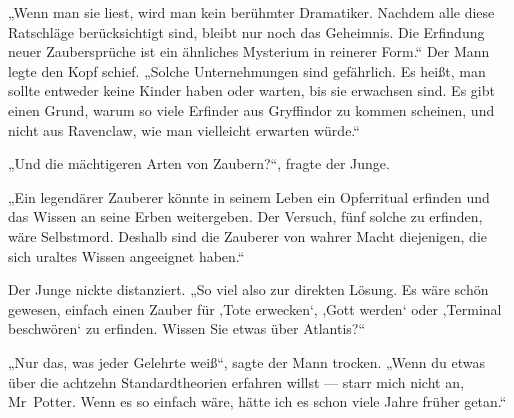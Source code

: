 „Wenn man sie liest, wird man kein berühmter Dramatiker. Nachdem alle diese Ratschläge berücksichtigt sind, bleibt nur noch das Geheimnis. Die Erfindung neuer Zaubersprüche ist ein ähnliches Mysterium in reinerer Form.“ Der Mann legte den Kopf schief.
„Solche Unternehmungen sind gefährlich. Es heißt, man sollte entweder keine Kinder haben oder warten, bis sie erwachsen sind. Es gibt einen Grund, warum so viele Erfinder aus Gryffindor zu kommen scheinen, und nicht aus Ravenclaw, wie man vielleicht erwarten würde.“

„Und die mächtigeren Arten von Zaubern?“, fragte der Junge.

„Ein legendärer Zauberer könnte in seinem Leben ein Opferritual erfinden und das Wissen an seine Erben weitergeben. Der Versuch, fünf solche zu erfinden, wäre Selbstmord. Deshalb sind die Zauberer von wahrer Macht diejenigen, die sich uraltes Wissen angeeignet haben.“

Der Junge nickte distanziert.
„So viel also zur direkten Lösung. Es wäre schön gewesen, einfach einen Zauber für ‚Tote erwecken‘, ‚Gott werden‘ oder ‚Terminal beschwören‘ zu erfinden. Wissen Sie etwas über Atlantis?“

„Nur das, was jeder Gelehrte weiß“, sagte der Mann trocken.
„Wenn du etwas über die achtzehn Standardtheorien erfahren willst — starr mich nicht an, Mr~Potter. Wenn es so einfach wäre, hätte ich es schon viele Jahre früher getan.“

